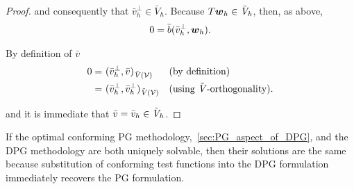 \begin{proof}
and consequently that $\bar{v}_h^{\bot} \in \bar{V}_h$. Because $T\mathit{\bm{{w}}}_h \in \tilde{\mathit{{{V}}}}_h$, then, as above,
\begin{align}
0 = \bar{b}(\bar{v}_h^{\bot},\mathit{\bm{{w}}}_h).
\end{align}

By definition of $\bar{v}$
\begin{align}
0
=\ &
(\bar{v}_h^{\bot},\bar{v})_{\tilde{\mathit{{{V}}}}(\mathcal{{{V}}})} && (\text{by definition}) \nonumber \\
=\ &
(\bar{v}_h^{\bot},\bar{v}_h^{\bot})_{\tilde{\mathit{{{V}}}}(\mathcal{{{V}}})} && (\text{using}\ \tilde{\mathit{{{V}}}}\text{-orthogonality}). \nonumber
\end{align}

and it is immediate that $\bar{v} = \bar{v}_h \in \tilde{\mathit{{{V}}}}_h$.

\end{proof}

If the optimal conforming PG methodology,~\autoref{sec:PG_aspect_of_DPG}, and the DPG methodology are both uniquely
solvable, then their solutions are the same because substitution of conforming test functions into the DPG formulation
immediately recovers the PG formulation.
